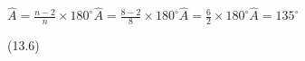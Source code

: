 \begin{table}[H]
{\begin{mdframed}[linewidth=4, leftmargin=40, rightmargin=40]
\begin{exercise}
\begin{enumerate}[noitemsep, label=\textbf{Step} \textbf{\arabic*}. ]
{\begin{equation}
      \end{equation}
    }{%
    \setlength{\mymathboxwidth}{\columnwidth}
      \addtolength{\mymathboxwidth}{-48pt}
    \par\vspace{12pt}\noindent\begin{minipage}{\columnwidth}
    \parbox[t]{\mymathboxwidth}{\large\begin{math}
    \hat{A}=\frac{n-2}{n}\ensuremath{\times}{180}^{\circ }\hat{A}=\frac{8-2}{8}\ensuremath{\times}{180}^{\circ }\hat{A}=\frac{6}{2}\ensuremath{\times}{180}^{\circ }\hat{A}={135}^{\circ }\end{math}}\hfill
    \parbox[t]{48pt}{\raggedleft 
    (13.6)}
    \end{minipage}\vspace{12pt}\par
    }%
    

\end{enumerate}
        


    \end{exercise}
    \end{mdframed}
    }
    \noindent
  
       

\end{table}
